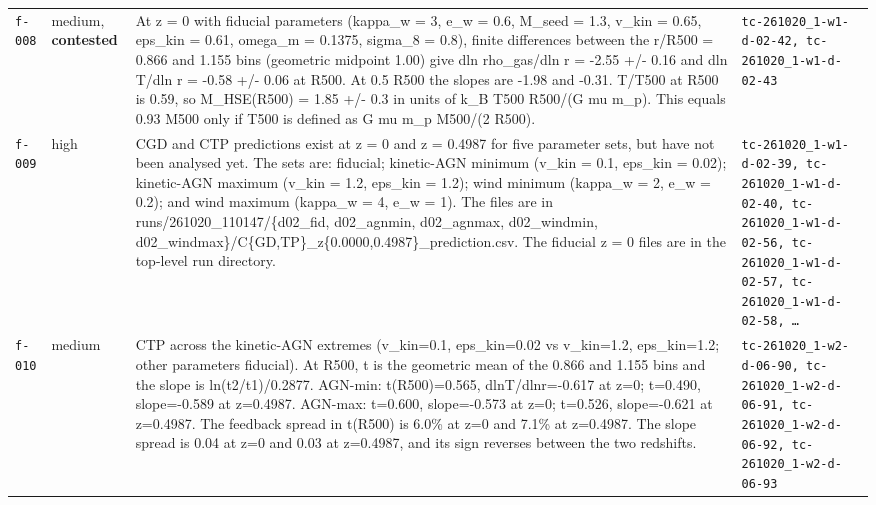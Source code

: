 \documentclass[11pt,a4paper]{article}
\begin{document}
\begin{longtable}{@{}p{}p{}p{}p{}@{}}
\texttt{f-008} & medium, \textbf{contested} & At z = 0 with fiducial parameters (kappa\_w = 3, e\_w = 0.6, M\_seed = 1.3, v\_kin = 0.65, eps\_kin = 0.61, omega\_m = 0.1375, sigma\_8 = 0.8), finite differences between the r/R500 = 0.866 and 1.155 bins (geometric midpoint 1.00) give dln rho\_gas/dln r = -2.55 +/- 0.16 and dln T/dln r = -0.58 +/- 0.06 at R500. At 0.5 R500 the slopes are -1.98 and -0.31. T/T500 at R500 is 0.59, so M\_HSE(R500) = 1.85 +/- 0.3 in units of k\_B T500 R500/(G mu m\_p). This equals 0.93 M500 only if T500 is defined as G mu m\_p M500/(2 R500). & \texttt{tc-261020\_\allowbreak{}1-w1-d-02-42,\allowbreak{} tc-261020\_\allowbreak{}1-w1-d-02-43} \\
\texttt{f-009} & high & CGD and CTP predictions exist at z = 0 and z = 0.4987 for five parameter sets, but have not been analysed yet. The sets are: fiducial; kinetic-AGN minimum (v\_kin = 0.1, eps\_kin = 0.02); kinetic-AGN maximum (v\_kin = 1.2, eps\_kin = 1.2); wind minimum (kappa\_w = 2, e\_w = 0.2); and wind maximum (kappa\_w = 4, e\_w = 1). The files are in runs/261020\_110147/\{d02\_fid, d02\_agnmin, d02\_agnmax, d02\_windmin, d02\_windmax\}/C\{GD,TP\}\_z\{0.0000,0.4987\}\_prediction.csv. The fiducial z = 0 files are in the top-level run directory. & \texttt{tc-261020\_\allowbreak{}1-w1-d-02-39,\allowbreak{} tc-261020\_\allowbreak{}1-w1-d-02-40,\allowbreak{} tc-261020\_\allowbreak{}1-w1-d-02-56,\allowbreak{} tc-261020\_\allowbreak{}1-w1-d-02-57,\allowbreak{} tc-261020\_\allowbreak{}1-w1-d-02-58,\allowbreak{} \ldots{}\allowbreak{}} \\
\texttt{f-010} & medium & CTP across the kinetic-AGN extremes (v\_kin=0.1, eps\_kin=0.02 vs v\_kin=1.2, eps\_kin=1.2; other parameters fiducial). At R500, t is the geometric mean of the 0.866 and 1.155 bins and the slope is ln(t2/t1)/0.2877. AGN-min: t(R500)=0.565, dlnT/dlnr=-0.617 at z=0; t=0.490, slope=-0.589 at z=0.4987. AGN-max: t=0.600, slope=-0.573 at z=0; t=0.526, slope=-0.621 at z=0.4987. The feedback spread in t(R500) is 6.0\% at z=0 and 7.1\% at z=0.4987. The slope spread is 0.04 at z=0 and 0.03 at z=0.4987, and its sign reverses between the two redshifts. & \texttt{tc-261020\_\allowbreak{}1-w2-d-06-90,\allowbreak{} tc-261020\_\allowbreak{}1-w2-d-06-91,\allowbreak{} tc-261020\_\allowbreak{}1-w2-d-06-92,\allowbreak{} tc-261020\_\allowbreak{}1-w2-d-06-93} \\

\end{longtable}
\end{document}
